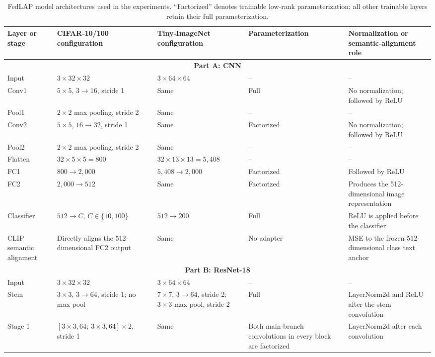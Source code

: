\begin{table}[t]
\centering
\caption{FedLAP model architectures used in the experiments.  ``Factorized''
denotes trainable low-rank parameterization; all other trainable layers retain
their full parameterization.}
\label{tab:appendix_model_architectures}
\scriptsize
\setlength{\tabcolsep}{4pt}
\renewcommand{\arraystretch}{1.12}
\begin{tabularx}{\textwidth}{@{}lXXp{2.7cm}X@{}}
\toprule
\textbf{Layer or stage} & \textbf{CIFAR-10/100 configuration} &
\textbf{Tiny-ImageNet configuration} & \textbf{Parameterization} &
\textbf{Normalization or semantic-alignment role} \\
\midrule
\multicolumn{5}{c}{\textbf{Part A: CNN}} \\
\midrule
Input & $3\times32\times32$ & $3\times64\times64$ & -- & -- \\
Conv1 & $5\times5$, $3\rightarrow16$, stride 1 & Same & Full & No normalization; followed by ReLU \\
Pool1 & $2\times2$ max pooling, stride 2 & Same & -- & -- \\
Conv2 & $5\times5$, $16\rightarrow32$, stride 1 & Same & Factorized & No normalization; followed by ReLU \\
Pool2 & $2\times2$ max pooling, stride 2 & Same & -- & -- \\
Flatten & $32\times5\times5=800$ & $32\times13\times13=5{,}408$ & -- & -- \\
FC1 & $800\rightarrow2{,}000$ & $5{,}408\rightarrow2{,}000$ & Factorized & Followed by ReLU \\
FC2 & $2{,}000\rightarrow512$ & Same & Factorized & Produces the 512-dimensional image representation \\
Classifier & $512\rightarrow C$, $C\in\{10,100\}$ & $512\rightarrow200$ & Full & ReLU is applied before the classifier \\
CLIP semantic alignment & Directly aligns the 512-dimensional FC2 output & Same & No adapter & MSE to the frozen 512-dimensional class text anchor \\
\midrule
\multicolumn{5}{c}{\textbf{Part B: ResNet-18}} \\
\midrule
Input & $3\times32\times32$ & $3\times64\times64$ & -- & -- \\
Stem & $3\times3$, $3\rightarrow64$, stride 1; no max pool & $7\times7$, $3\rightarrow64$, stride 2; $3\times3$ max pool, stride 2 & Full & LayerNorm2d and ReLU after the stem convolution \\
Stage 1 & $[3\times3,64;\ 3\times3,64]\times2$, stride 1 & Same & Both main-branch convolutions in every block are factorized & LayerNorm2d after each convolution \\

\end{tabularx}
\end{table}
